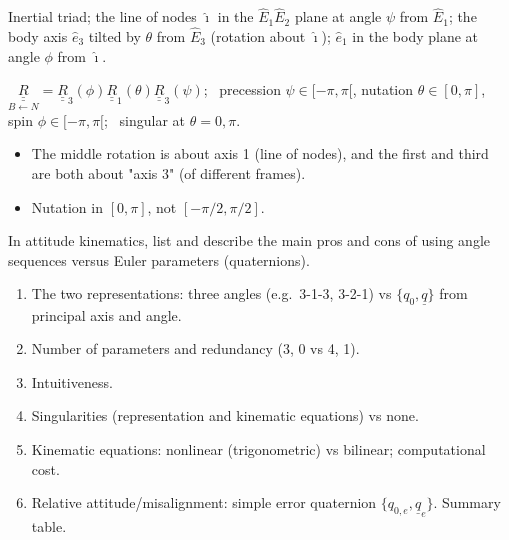 \begin{fig2draw}
Inertial triad; the line of nodes $\hat\imath$ in the $\hat E_1\hat E_2$ plane at angle $\psi$ from $\hat E_1$; the body axis $\hat e_3$ tilted by $\theta$
from $\hat E_3$ (rotation about $\hat\imath$); $\hat e_1$ in the body plane at angle $\phi$ from $\hat\imath$.
\end{fig2draw}

\begin{keyf}
$\underset{B\leftarrow N}{\underline{\underline R}}=\underline{\underline R}_3(\phi)\underline{\underline R}_1(\theta)\underline{\underline R}_3(\psi)$; \
precession $\psi\in[-\pi,\pi[$, nutation $\theta\in[0,\pi]$, spin $\phi\in[-\pi,\pi[$; \ singular at $\theta=0,\pi$.
\end{keyf}

\pitfalls
\begin{itemize}
\item The middle rotation is about axis 1 (line of nodes), and the first and third are both about "axis 3" (of different frames).
\item Nutation in $[0,\pi]$, not $[-\pi/2,\pi/2]$.
\end{itemize}


\begin{qbox}
In attitude kinematics, list and describe the main pros and cons of using angle sequences versus Euler parameters (quaternions).
\qmeta{list by chapter (Ch.\,9).}
\end{qbox}

\begin{outline}
\begin{enumerate}
\item The two representations: three angles (e.g.\ 3-1-3, 3-2-1) vs $\{q_0,\underline q\}$ from principal axis and angle.
\item Number of parameters and redundancy (3, 0 vs 4, 1).
\item Intuitiveness.
\item Singularities (representation and kinematic equations) vs none.
\item Kinematic equations: nonlinear (trigonometric) vs bilinear; computational cost.
\item Relative attitude/misalignment: simple error quaternion $\{q_{0,e},\underline q_e\}$. Summary table.
\end{enumerate}
\end{outline}

